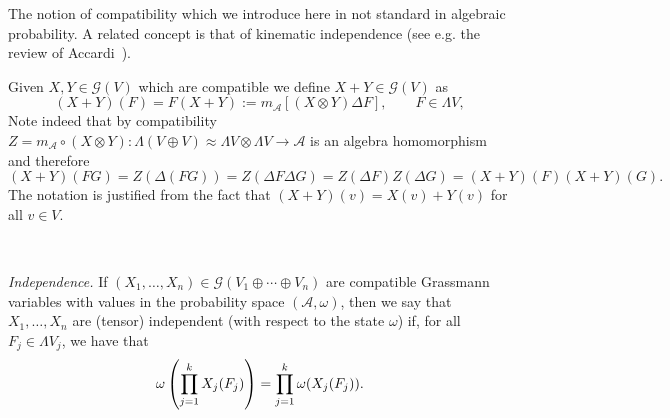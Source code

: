 \documentclass{article}
\newcommand{\assign}{:=}
\newcommand{\tmtextit}[1]{{\itshape{#1}}}
\begin{document}
\begin{remark}
  The notion of compatibility which we introduce here in not standard in
  algebraic probability. A related concept is that of kinematic independence
  (see e.g. the review of Accardi~{\cite{accardi_outline_2015}}).
\end{remark}

Given $X, Y \in \mathcal{G} (V)$ which are compatible we define $X + Y \in
\mathcal{G} (V)$ as
\[ (X + Y) (F) = F (X + Y) \assign m_{\mathcal{A}} [(X \otimes Y) \Delta F],
   \qquad F \in \Lambda V, \]
Note indeed that by compatibility $Z = m_{\mathcal{A}} \circ (X \otimes Y) :
\Lambda (V \oplus V) \approx \Lambda V \otimes \Lambda V \rightarrow
\mathcal{A}$ is an algebra homomorphism and therefore \
\[ (X + Y) (F G) = Z (\Delta (F G)) = Z (\Delta F \Delta G) = Z (\Delta F) Z
   (\Delta G) = (X + Y) (F) (X + Y) (G) . \]
The notation is justified from the fact that $(X + Y) (v) = X (v) + Y (v)$ for
all $v \in V$.

\

\tmtextit{Independence.} If $(X_1, \ldots, X_n) \in \mathcal{G} (V_1 \oplus
\cdots \oplus V_n)$ are compatible Grassmann variables with values in the
probability space $(\mathcal{A}, \omega)$, then we say that $X_1, \ldots, X_n$
are (tensor) independent (with respect to the state $\omega$) if, for all $F_j
\in \Lambda V_j$, we have that~{\cite{dirksen_noncommutative_2010}}
\[ \omega \left( \prod_{j = 1}^k \vphantom{\frac{}{}} X_j (F_j) \right) =
   \prod_{j = 1}^k \omega (X_j (F_j)) . \]
\end{document}
